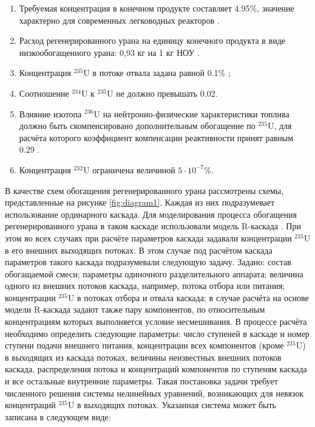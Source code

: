 \begin{enumerate}
  \item Требуемая концентрация в конечном продукте составляет 4.95\%, значение характерно для современных легководных реакторов \cite{solovevaCennostiOYaTKak2019}.
  \item Расход регенерированного урана на единицу конечного продукта в виде низкообогащенного урана: 0,93 кг на 1 кг НОУ \cite{smirnovApplyingEnrichmentCapacities2018}.
  \item Концентрация $^{235}$U в потоке отвала задана равной 0.1\% \cite{smirnovEvolutionIsotopicComposition2012};
  \item Соотношение $^{234}$U к $^{235}$U не должно превышать 0.02.
  \item Влияние изотопа $^{236}$U на нейтронно-физические характеристики топлива должно быть скомпенсировано дополнительным обогащение по $^{235}$U, для расчёта которого коэффициент компенсации реактивности принят равным 0.29 \cite{smirnovApplyingEnrichmentCapacities2018}.
  \item Концентрация $^{232}$U ограничена величиной $5\cdot10^{-7}$\%.
\end{enumerate}

В качестве схем обогащения регенерированного урана рассмотрены схемы, представленные на рисунке \ref{fig:diagram1}.
Каждая из них подразумевает использование ординарного каскада. Для моделирования процесса обогащения регенерированного урана в таком каскаде использовали модель R-каскада \cite{sulaberidzeTeoriyaKaskadovDlya2011}. При этом во всех случаях при расчёте параметров каскада задавали концентрации $^{235}$U в его внешних выходящих потоках. В этом случае под расчётом каскада параметров такого каскада подразумевали следующую задачу. 
Задано: состав обогащаемой смеси; параметры одиночного разделительного аппарата; величина одного из внешних потоков каскада, например, потока отбора или питания; концентрации $^{235}$U в потоках отбора и отвала каскада; в случае расчёта на основе модели R-каскада задают также пару компонентов, по относительным концентрациям которых выполняется условие несмешивания.
В процессе расчёта необходимо определить следующие параметры: число ступеней в каскаде и номер ступени подачи внешнего питания, концентрации всех компонентов (кроме $^{235}$U) в выходящих из каскада потоках, величины неизвестных внешних потоков каскада, распределения потока и концентраций компонентов по ступеням каскада и все остальные внутренние параметры. 
Такая постановка задачи требует численного решения системы нелинейных уравнений, возникающих для невязок концентраций $^{235}$U в выходящих потоках. Указанная система может быть записана в следующем виде: 

